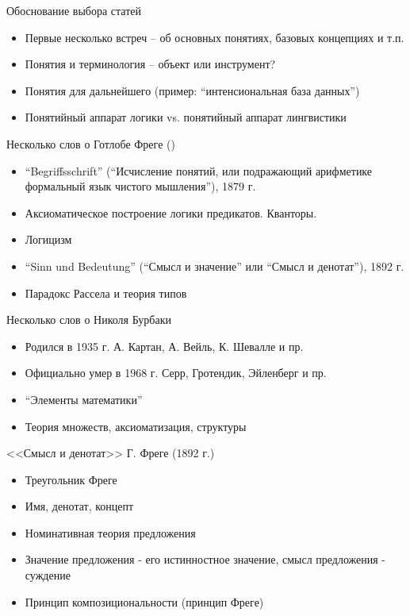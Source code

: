 \documentclass{beamer}
\begin{document}
\begin{frame}{Обоснование выбора статей}
    \begin{itemize}
        \item Первые несколько встреч -- об основных понятиях, базовых концепциях и т.п.
        \item Понятия и терминология -- объект или инструмент?
        \item Понятия для дальнейшего (пример: ``интенсиональная база данных'')
        \item Понятийный аппарат логики vs. понятийный аппарат лингвистики
    \end{itemize}
\end{frame}

\begin{frame}{Несколько слов о Готлобе Фреге ()}
    \begin{itemize}
        \item ``Begriffsschrift'' (``Исчисление понятий, или подражающий арифметике формальный язык чистого мышления''), 1879 г.
        \item Аксиоматическое построение логики предикатов. Кванторы.
        \item Логицизм
        \item ``Sinn und Bedeutung'' (``Смысл и значение'' или ``Смысл и денотат''), 1892 г.
        \item Парадокс Рассела и теория типов
    \end{itemize}
\end{frame}

\begin{frame}{Несколько слов о Николя Бурбаки}
    \begin{itemize}
        \item Родился в 1935 г. А. Картан, А. Вейль, К. Шевалле и пр.
        \item Официально умер в 1968 г. Серр, Гротендик, Эйленберг и пр.
        \item ``Элементы математики''
        \item Теория множеств, аксиоматизация, структуры
    \end{itemize}
\end{frame}

\begin{frame}{<<Смысл и денотат>> Г. Фреге (1892 г.)}
    \begin{itemize}
        \item Треугольник Фреге
        \item Имя, денотат, концепт
        \item Номинативная теория предложения
        \item Значение предложения - его истинностное значение, смысл предложения - суждение
        \item Принцип композициональности (принцип Фреге)
    \end{itemize}
\end{frame}
\end{document}
